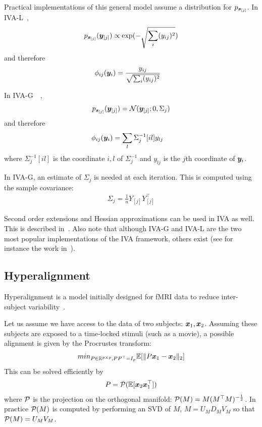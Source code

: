 Practical implementations of this general model assume a distribution for
$p_{\boldsymbol{s}_{[j]}}$.
In IVA-L~\cite{lee2008independent},
\begin{align}
  p_{\boldsymbol{s}_{[j]}}(\boldsymbol{y}_{[j]}) \propto \exp(-\sqrt{\sum_i (y_{ij})^2})
\end{align}
and therefore
\begin{align}
  \phi_{ij}(\boldsymbol{y}_i) &= \frac{y_{ij}}{\sqrt{\sum_i (y_{ij})^2}}
\end{align}

In IVA-G~\cite{anderson2011joint}~\cite{via2011maximum},
\begin{align}
  p_{\boldsymbol{s}_{[j]}}(\boldsymbol{y}_{[j]}) = \mathcal{N}( \boldsymbol{y}_{[j]}; 0, \Sigma_j)
\end{align}
and therefore
\begin{align}
  \phi_{ij}(\boldsymbol{y}_i) &= \sum_l \Sigma_j^{-1}[il] y_{lj}
\end{align}
where  $\Sigma_j^{-1}[il]$ is the coordinate $i, l$ of $\Sigma_j^{-1}$ and
$y_{lj}$ is the $j$th coordinate of $\boldsymbol{y}_i$.

In IVA-G, an estimate of $\Sigma_j$ is needed at each iteration. This is
computed using the sample covariance:
\begin{align}
\Sigma_j = \frac1{n} Y_{[j]} Y_{[j]}^{\top}
\end{align}

Second order extensions and Hessian approximations can be used in IVA as well.
This is described in~\cite{anderson2011joint}. Also note that although IVA-G and
IVA-L are the two most popular implementations of the IVA framework, others exist
(see for instance the work in~\cite{anderson2013independent}).

\subsection{Hyperalignment}
Hyperalignment is a model initially designed for fMRI data to reduce
inter-subject variability~\cite{haxby2011common}.

Let us assume we have access to the data of two subjects: $\boldsymbol{x}_1, \boldsymbol{x}_2$.
Assuming these subjects are exposed to a time-locked stimuli (such as a movie), a possible alignment is given by the Procrustes transform:
\begin{align}
min_{P \in \mathbb{R}^{p \times p}, PP^{\top} = I_p} \mathbb{E}[\|P \boldsymbol{x}_1 - \boldsymbol{x}_2 \|_2]
\end{align}
This can be solved efficiently by
\begin{align}
  P = \mathcal{P}(\mathbb{E}[\boldsymbol{x}_2 \boldsymbol{x}_1^{\top}])
\end{align}
where $\mathcal{P}$ is the projection on the orthogonal manifold: $\mathcal{P}(M) = M
(M^{\top}M)^{-\frac12}$. In practice $\mathcal{P}(M)$ is computed by performing an SVD
of $M$, $M = U_M D_M V_M $ so that $\mathcal{P}(M) = U_M V_M$.

